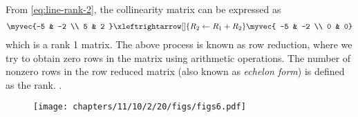 			From \eqref{eq:line-rank-2},
the collinearity matrix can be expressed as
 \begin{align}
			    \myvec{-5 & -2
			    \\
			    5 & 2 }  
			    \xleftrightarrow[]{R_2 \leftarrow {R_1 + R_2}}
			    \myvec{	    -5 & -2  
			    \\
			    0 & 0}  
\end{align}
which is a rank 1 matrix. The above process is known as row reduction, where we try to obtain zero rows in the matrix using arithmetic operations.  The number of nonzero rows in the row reduced matrix (also known as {\em echelon form})
is defined as the rank.
		.
	\begin{figure}[H]
		\centering
 \texttt{[image: chapters/11/10/2/20/figs/figs6.pdf]}
		\caption{}
		\label{fig:11/10/2/20}
  	\end{figure}
